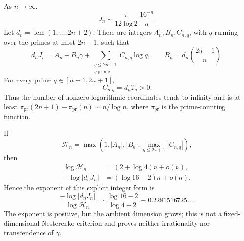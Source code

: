 \begin{theorem}
\label{thm:Jn-asymptotic-integerization}
As \(n\to\infty\),
\begin{equation}\label{eq:Jn-correct-asymptotic}
 \boxed{\displaystyle
 J_n\sim\frac{\pi}{12\log2}\,\frac{16^{-n}}n.}
\end{equation}
Let \(d_n=\operatorname{lcm}(1,\ldots,2n+2)\).  There are integers
\(A_n,B_n,C_{n,q}\), with \(q\) running over the primes at most \(2n+1\),
such that
\begin{equation}\label{eq:Jn-integer-linear-form}
 d_nJ_n=A_n+B_n\gamma+
 \sum_{\substack{q\le2n+1\\q\ \mathrm{prime}}}C_{n,q}\log q,
 \qquad
 B_n=d_n\binom{2n+1}{n}.
\end{equation}
For every prime \(q\in[n+1,2n+1]\),
\begin{equation}\label{eq:Jn-prime-coefficient-positive}
 C_{n,q}=d_nT_q>0.
\end{equation}
Thus the number of nonzero logarithmic coordinates tends to infinity and is
at least
\(\pi_{\mathrm{pr}}(2n+1)-\pi_{\mathrm{pr}}(n)\sim n/\log n\), where
\(\pi_{\mathrm{pr}}\) is the prime-counting function.

If
\[
 \mathcal H_n=\max\left(
 1,|A_n|,|B_n|,
 \max_{q\le2n+1}|C_{n,q}|
 \right),
\]
then
\begin{align}
 \log\mathcal H_n&=(2+\log4)n+o(n),
 \label{eq:Jn-integer-height}\\
 -\log|d_nJ_n|&=(\log16-2)n+o(n).
 \label{eq:Jn-integer-smallness}
\end{align}
Hence the exponent of this explicit integer form is
\begin{equation}\label{eq:Jn-correct-tau}
 \frac{-\log|d_nJ_n|}{\log\mathcal H_n}
 \longrightarrow
 \frac{\log16-2}{\log4+2}
 =0.2281516725\ldots.
\end{equation}
The exponent is positive, but the ambient dimension grows; this is not a
fixed-dimensional Nesterenko criterion and proves neither irrationality nor
transcendence of \(\gamma\).
\end{theorem}

